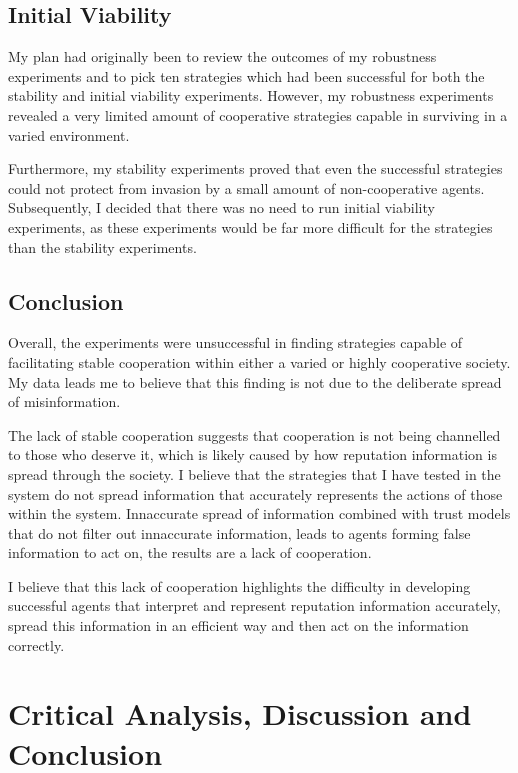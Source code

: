 \documentclass[]{final_report}
\begin{document}
\section{Initial Viability}
My plan had originally been to review the outcomes of my robustness experiments and to pick ten strategies which had been successful for both the stability and initial viability experiments. However, my robustness experiments revealed a very limited amount of cooperative strategies capable in surviving in a varied environment.\par Furthermore, my stability experiments proved that even the successful strategies could not protect from invasion by a small amount of non-cooperative agents. Subsequently, I decided that there was no need to run initial viability experiments, as these experiments would be far more difficult for the strategies than the stability experiments.

\section{Conclusion}
Overall, the experiments were unsuccessful in finding strategies capable of facilitating stable cooperation within either a varied or highly cooperative society. My data leads me to believe that this finding is not due to the deliberate spread of misinformation.\par 
The lack of stable cooperation suggests that cooperation is not being channelled to those who deserve it, which is likely caused by how reputation information is spread through the society. I believe that the strategies that I have tested in the system do not spread information that accurately represents the actions of those within the system. Innaccurate spread of information combined with trust models that do not filter out innaccurate information, leads to agents forming false information to act on, the results are a lack of cooperation.\par 
I believe that this lack of cooperation highlights the difficulty in developing successful agents that interpret and represent reputation information accurately, spread this information in an efficient way and then act on the information correctly. 

\chapter{Critical Analysis, Discussion and Conclusion}
\end{document}
